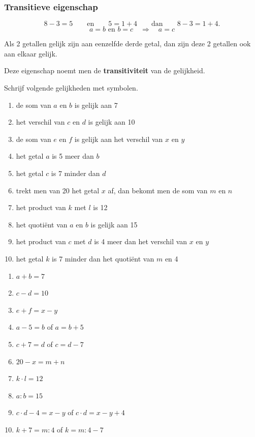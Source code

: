 \documentclass{bis}
\begin{document}
\subsubsection{Transitieve eigenschap}

\[8-3=5\qquad\text{en}\qquad5=1+4\qquad\text{dan}\qquad8-3=1+4.\]
\[a=b\text{ en }b=c\quad\Rightarrow\quad a=c\]
\begin{onthoud}
Als 2 getallen gelijk zijn aan eenzelfde derde getal, dan zijn deze 2 getallen ook aan elkaar
gelijk.
\end{onthoud}
Deze eigenschap noemt men de \textbf{transitiviteit} van de gelijkheid.

\begin{exercise}
Schrijf volgende gelijkheden met symbolen.
\begin{enumerate}
  \item de som van $a$ en $b$ is gelijk aan 7
  \item het verschil van $c$ en $d$ is gelijk aan 10
  \item de som van $e$ en $f$ is gelijk aan het verschil van $x$ en $y$
  \item het getal $a$ is 5 meer dan $b$
  \item het getal $c$ is 7 minder dan $d$
  \item trekt men van 20 het getal $x$ af, dan bekomt men de som van $m$ en $n$
  \item het product van $k$ met $l$ is 12
  \item het quotiënt van $a$ en $b$ is gelijk aan 15
  \item het product van $c$ met $d$ is 4 meer dan het verschil van $x$ en $y$
  \item het getal $k$ is 7 minder dan het quotiënt van $m$ en 4
\end{enumerate}
\end{exercise}

\begin{solution}
\begin{enumerate}
  \item $a+b=7$
  \item $c-d=10$
  \item $e+f=x-y$
  \item $a-5=b$ of $a=b+5$
  \item $c+7=d$ of $c=d-7$
  \item $20-x=m+n$
  \item $k\cdot l=12$
  \item $a:b=15$
  \item $c\cdot d-4=x-y$ of $c\cdot d=x-y+4$
  \item $k+7=m:4$ of $k=m:4-7$
\end{enumerate}
\end{solution}
\end{document}
